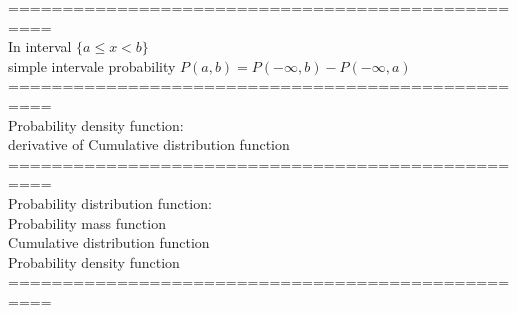 \documentclass{article}
\begin{document}
================================================== \\
In interval $\{ a \leq x < b \}$ \\ 
simple intervale probability $P(a, b) = P(-\infty, b) - P(-\infty, a)$ \\

================================================== \\
Probability density function: \\ 
derivative of Cumulative distribution function \\ 

================================================== \\
Probability distribution function: \\ 
Probability mass function \\ 
Cumulative distribution function \\ 
Probability density function \\ 

================================================== \\
\end{document}
